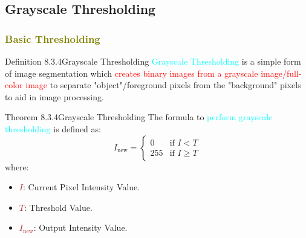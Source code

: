 \documentclass{book}
\begin{document}
\subsection{Grayscale Thresholding}
\textcolor{olive}{\subsubsection{Basic Thresholding}}
\begin{defBox}{Definition 8.3.4}{Grayscale Thresholding}
    \textcolor{cyan}{Grayscale Thresholding} is a simple form of image segmentation which \textcolor{red}{creates binary images from a grayscale image/full-color image} to separate "object"/foreground pixels from the "background" pixels to aid in image processing.
\end{defBox}
\begin{thmBox}{Theorem 8.3.4}{Grayscale Thresholding}
    The formula to \textcolor{cyan}{perform grayscale thresholding} is defined as:
    \[
        I_{\text{new}} = \begin{cases}
            0 & \text{if } I < T \\
            255 & \text{if } I \geq T
        \end{cases}
    \]
    where:
    \begin{itemize}
        \item \textcolor{brown}{\(I\)}: Current Pixel Intensity Value.
        \item \textcolor{brown}{\(T\)}: Threshold Value.
        \item \textcolor{brown}{\(I_{\text{new}}\)}: Output Intensity Value.
    \end{itemize}
\end{thmBox}
\newpage
\end{document}
